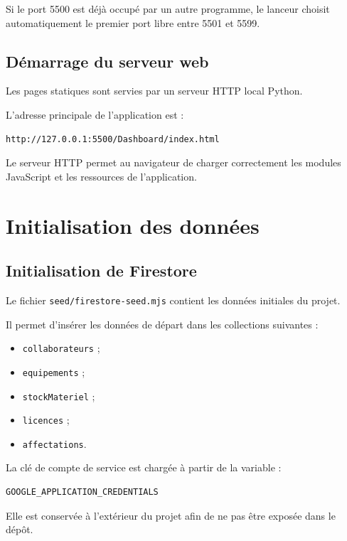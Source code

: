 \documentclass{rapportENSIAS}
\begin{document}
Si le port 5500 est déjà occupé par un autre programme, le lanceur choisit automatiquement le premier port libre entre 5501 et 5599.

\subsection{Démarrage du serveur web}

Les pages statiques sont servies par un serveur HTTP local Python.

L’adresse principale de l’application est :

\begin{verbatim}
http://127.0.0.1:5500/Dashboard/index.html
\end{verbatim}

Le serveur HTTP permet au navigateur de charger correctement les modules JavaScript et les ressources de l’application.

\section{Initialisation des données}

\subsection{Initialisation de Firestore}

Le fichier \texttt{seed/firestore-seed.mjs} contient les données initiales du projet.

Il permet d’insérer les données de départ dans les collections suivantes :

\begin{itemize}
    \item \texttt{collaborateurs} ;
    \item \texttt{equipements} ;
    \item \texttt{stockMateriel} ;
    \item \texttt{licences} ;
    \item \texttt{affectations}.
\end{itemize}

La clé de compte de service est chargée à partir de la variable :

\begin{verbatim}
GOOGLE_APPLICATION_CREDENTIALS
\end{verbatim}

Elle est conservée à l’extérieur du projet afin de ne pas être exposée dans le dépôt.
\end{document}
